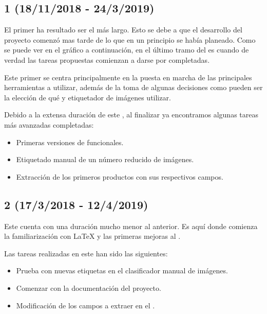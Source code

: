 \subsection{ 1 (18/11/2018 - 24/3/2019)}
El primer  ha resultado ser el más largo. Esto se debe a que el desarrollo del proyecto comenzó mas tarde de lo que en un principio se había planeado. Como se puede ver en el gráfico  a continuación, en el último tramo del  es cuando de verdad las tareas propuestas comienzan a darse por completadas.


Este primer  se centra principalmente en la puesta en marcha de las principales herramientas a utilizar, además de la toma de algunas decisiones como pueden ser la elección de qué  y etiquetador de imágenes utilizar.

Debido a la extensa duración de este , al finalizar ya encontramos algunas tareas más avanzadas completadas:

\begin{itemize}
    \item Primeras versiones de  funcionales.
    \item Etiquetado manual de un número reducido de imágenes.
    \item Extracción de los primeros productos con sus respectivos campos.
\end{itemize}


\subsection{ 2 (17/3/2018 - 12/4/2019)}
 Este  cuenta con una duración mucho menor al anterior. Es aquí donde comienza la familiarización con \LaTeX{} y las primeras mejoras al .
 
 
Las tareas realizadas en este  han sido las siguientes:
 
\begin{itemize}
    \item Prueba con nuevas etiquetas en el clasificador manual de imágenes.
    \item Comenzar con la documentación del proyecto.
    \item Modificación de los campos a extraer en el .
\end{itemize}


